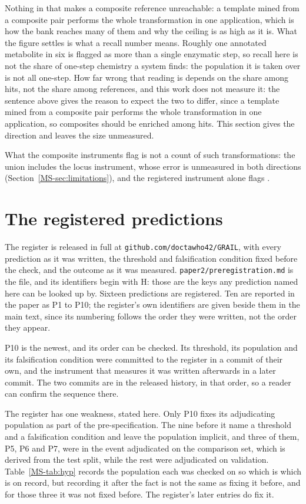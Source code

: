\documentclass[journal=jcisd8,manuscript=suppinfo,layout=onecolumn]{achemso}
\begin{document}
Nothing in that makes a composite reference unreachable: a template mined from a composite pair
performs the whole transformation in one application, which is how the bank reaches many of them
and why the ceiling is as high as it is. What the figure settles
is what a recall number means. Roughly one annotated metabolite in six is flagged as more than a
single enzymatic step, so recall here is not the share of one-step chemistry a system finds: the
population it is taken
over is not all one-step. How far wrong that reading is
depends on the share among hits, not the share among references, and this work does not measure it:
the
sentence above gives the reason to expect the two to differ, since a template mined from a composite
pair performs the whole transformation in one application, so composites should be enriched among
hits. This section gives the direction and leaves the size unmeasured.


What the composite instruments flag is not a count of such transformations: the union includes the
locus instrument, whose error is unmeasured
in both directions (Section~\ref{MS-sec:limitations}), and the registered instrument alone flags
\numRefstepEdits{}.
\section{The registered predictions}
\label{sec:si-register}

The register is released in full at \texttt{github.com/doctawho42/GRAIL}, with every prediction as
it was written, the threshold and falsification condition fixed before the check, and the outcome
as it was measured. \texttt{paper2/preregistration.md} is the file, and its identifiers begin with H:
those are the keys any prediction named here can be looked up by. Sixteen predictions are registered. Ten are reported in the paper as P1 to
P10; the register's own identifiers are given beside them in the main text, since its numbering
follows the order they were written, not the order they appear.

P10 is the newest, and its order can be checked. Its threshold, its population
and its falsification condition were committed to the register in a commit of their own, and the
instrument that measures it was written afterwards in a later commit. The two commits are in the
released history, in that order, so a reader can confirm the sequence there.

The register has one weakness, stated here. Only P10 fixes its
adjudicating population as part of the pre-specification. The nine before it name a threshold and
a falsification condition and leave the population implicit, and three of them, P5, P6 and P7,
were in the event adjudicated on the comparison set, which is derived from the test split,
while the rest were adjudicated on validation. Table~\ref{MS-tab:hyp} records the population each
was checked on
so which is which is on record, but recording it after the fact is not the same as fixing
it before, and for those three it was not fixed before. The register's later entries do fix it.
\end{document}
